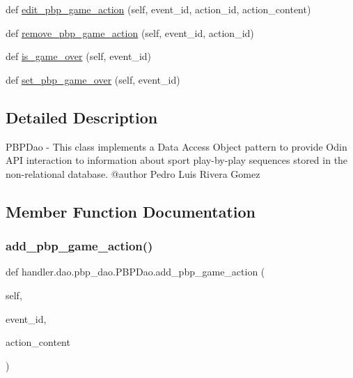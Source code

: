 \begin{DoxyCompactItemize}
\item 
def \hyperlink{classhandler_1_1dao_1_1pbp__dao_1_1_p_b_p_dao_a8b192ac72466e526e818299c691eb114}{edit\+\_\+pbp\+\_\+game\+\_\+action} (self, event\+\_\+id, action\+\_\+id, action\+\_\+content)
\item 
def \hyperlink{classhandler_1_1dao_1_1pbp__dao_1_1_p_b_p_dao_acfab7336b3367e17ca6a987434f095cf}{remove\+\_\+pbp\+\_\+game\+\_\+action} (self, event\+\_\+id, action\+\_\+id)
\item 
def \hyperlink{classhandler_1_1dao_1_1pbp__dao_1_1_p_b_p_dao_a402928f0a55ebe2f1295e0b6dac76123}{is\+\_\+game\+\_\+over} (self, event\+\_\+id)
\item 
def \hyperlink{classhandler_1_1dao_1_1pbp__dao_1_1_p_b_p_dao_a02048c0945e96af5c39c556f8786c8ce}{set\+\_\+pbp\+\_\+game\+\_\+over} (self, event\+\_\+id)
\end{DoxyCompactItemize}


\subsection{Detailed Description}
\begin{DoxyVerb}PBPDao - This class implements a Data Access Object pattern to provide 
         Odin API interaction to information about sport play-by-play 
         sequences stored in the non-relational database.
@author Pedro Luis Rivera Gomez
\end{DoxyVerb}
 

\subsection{Member Function Documentation}
\mbox{\label{classhandler_1_1dao_1_1pbp__dao_1_1_p_b_p_dao_a7faa4be8c78c01da5c4abc9a2bf97a0b}} 
\subsubsection{\texorpdfstring{add\+\_\+pbp\+\_\+game\+\_\+action()}{add\_pbp\_game\_action()}}
{\footnotesize\ttfamily def handler.\+dao.\+pbp\+\_\+dao.\+P\+B\+P\+Dao.\+add\+\_\+pbp\+\_\+game\+\_\+action (\begin{DoxyParamCaption}\item[{}]{self,  }\item[{}]{event\+\_\+id,  }\item[{}]{action\+\_\+content }\end{DoxyParamCaption})}

